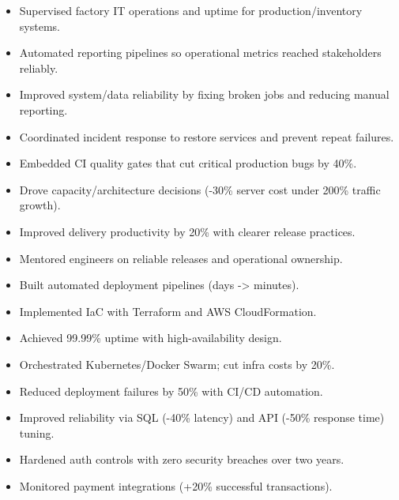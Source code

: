 \begin{itemize}
  \item Supervised factory IT operations and uptime for production/inventory systems.
  \item Automated reporting pipelines so operational metrics reached stakeholders reliably.
  \item Improved system/data reliability by fixing broken jobs and reducing manual reporting.
  \item Coordinated incident response to restore services and prevent repeat failures.
\end{itemize}
\vspace{4pt}
\begin{itemize}
  \item Embedded CI quality gates that cut critical production bugs by 40\%.
  \item Drove capacity/architecture decisions (-30\% server cost under 200\% traffic growth).
  \item Improved delivery productivity by 20\% with clearer release practices.
  \item Mentored engineers on reliable releases and operational ownership.
\end{itemize}
\vspace{4pt}
\begin{itemize}
  \item Built automated deployment pipelines (days -> minutes).
  \item Implemented IaC with Terraform and AWS CloudFormation.
  \item Achieved 99.99\% uptime with high-availability design.
  \item Orchestrated Kubernetes/Docker Swarm; cut infra costs by 20\%.
  \item Reduced deployment failures by 50\% with CI/CD automation.
\end{itemize}
\vspace{4pt}
\begin{itemize}
  \item Improved reliability via SQL (-40\% latency) and API (-50\% response time) tuning.
  \item Hardened auth controls with zero security breaches over two years.
  \item Monitored payment integrations (+20\% successful transactions).
\end{itemize}
